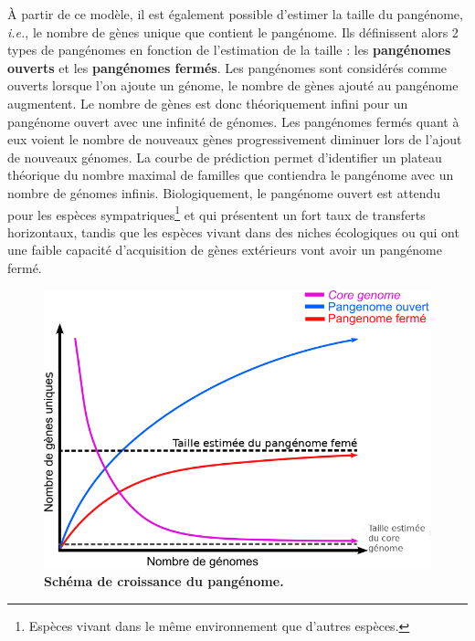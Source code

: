 À partir de ce modèle, il est également possible d'estimer la taille du pangénome, \textit{i.e.}, le nombre de gènes unique que contient le pangénome. Ils définissent alors 2 types de pangénomes en fonction de l'estimation de la taille : les \textbf{pangénomes ouverts} et les \textbf{pangénomes fermés}. Les pangénomes sont considérés comme ouverts lorsque l'on ajoute un génome, le nombre de gènes ajouté au pangénome augmentent. Le nombre de gènes est donc théoriquement infini pour un pangénome ouvert avec une infinité de génomes. Les pangénomes fermés quant à eux voient le nombre de nouveaux gènes progressivement diminuer lors de l'ajout de nouveaux génomes. La courbe de prédiction permet d'identifier un plateau théorique du nombre maximal de familles que contiendra le pangénome avec un nombre de génomes infinis. Biologiquement, le pangénome ouvert est attendu pour les espèces sympatriques\footnote{Espèces vivant dans le même environnement que d'autres espèces.} et qui présentent un fort taux de transferts horizontaux, tandis que les espèces vivant dans des niches écologiques ou qui ont une faible capacité d'acquisition de gènes extérieurs vont avoir un pangénome fermé.

\begin{figure}[htbp]
    \centering
    \includegraphics[width=0.85\linewidth]{images/panOpenClose.png}
    \caption[Schéma de croissance du pangénome]{\textbf{Schéma de croissance du pangénome.}}
    \label{fig:panOpenClose}
\end{figure}

